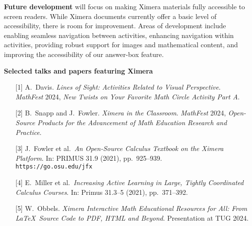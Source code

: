 \documentclass[twocolumn]{article}
\makeatletter
\newcommand{\mylabel}[2]{#2\def\@currentlabel{#2}\label{#1}}
\makeatother
\begin{document}
\vspace{-.2cm}  

\begin{xframe}
    {\sffamily\bfseries Future development} will focus on making Ximera
    materials fully accessible to screen readers. While Ximera documents
    currently
    offer a basic level of accessibility, there is room for
    improvement. Areas of development include enabling seamless navigation
    between activities, enhancing navigation within activities, providing
    robust
    support for images and mathematical content, and improving the
    accessibility of
    our answer-box feature.
\end{xframe}

\restoregeometry



\begin{xframe}
    {\sffamily\bfseries Selected talks and papers featuring Ximera}
    \begin{itemize}
        \item[{[1]}] A.\ Davis. \textit{Lines of Sight: Activities Related to Visual
        Perspective}.  \textit{MathFest} 2024,
    \textit{New Twists on Your Favorite Math Circle Activity Part A}.
    \item[{[2]}] B.\ Snapp and J.\
    Fowler. \textit{Ximera in the Classroom}. 
    \textit{MathFest} 2024, \textit{Open-Source
        Products for
        the Advancement of Math Education Research and Practice}.
        \item[\mylabel{F21}{[3]}] J.\ Fowler et al.\ \textit{An Open-Source
            Calculus Textbook on the Ximera Platform}. In:
        PRIMUS 31.9 (2021), pp.\ 925--939. \\%
        \qrcode{https://go.osu.edu/jfx}\quad
        {\tt  https://go.osu.edu/jfx}
        \item[{[4]}] E.\ Miller et al.\ \textit{Increasing Active Learning in
            Large, Tightly Coordinated Calculus Courses}. In: Primus 31.3--5
        (2021), pp.\
        371--392.\\
        \item[{[5]}] W.\ Obbels. \textit{Ximera Interactive Math Educational
            Resources for All: From \LaTeX\ Source Code to PDF, HTML and
            Beyond}.
        Presentation at TUG 2024.\\
        \quad

\end{itemize}
\end{xframe}
\end{document}
